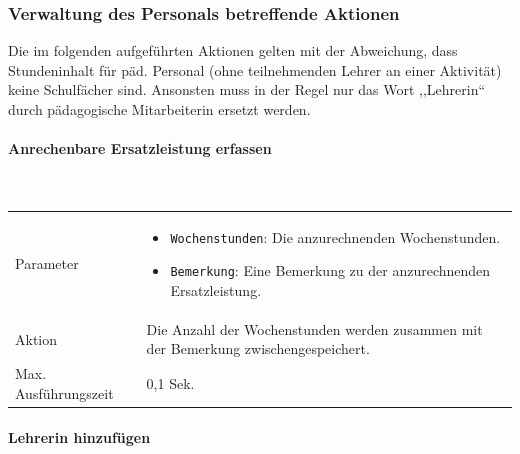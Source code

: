 \documentclass[fontsize=12pt,paper=a4,twoside]{scrartcl}
\begin{document}
\subsubsection{Verwaltung des Personals betreffende Aktionen}

Die im folgenden aufgeführten Aktionen gelten mit der Abweichung, dass Stundeninhalt für päd. Personal (ohne teilnehmenden Lehrer an einer Aktivität) keine Schulfächer sind. Ansonsten muss in der Regel nur das Wort ,,Lehrerin`` durch pädagogische Mitarbeiterin ersetzt werden.\\

\paragraph{Anrechenbare Ersatzleistung erfassen}\mbox{}\\

\begin{tabularx}{\textwidth}{p{4cm}X}
Parameter & \begin{itemize}[itemsep=0pt, leftmargin = 0.5cm]
			\item \texttt{Wochenstunden}: Die anzurechnenden Wochenstunden.
			\item \texttt{Bemerkung}: Eine Bemerkung zu der anzurechnenden Ersatzleistung.
			\end{itemize}\\
Aktion & Die Anzahl der Wochenstunden werden zusammen mit der Bemerkung  zwischengespeichert.\\
Max. Ausführungszeit & 0,1 Sek. 
\end{tabularx}

\clearpage
\paragraph{Lehrerin hinzufügen}\mbox{}\\
\end{document}
